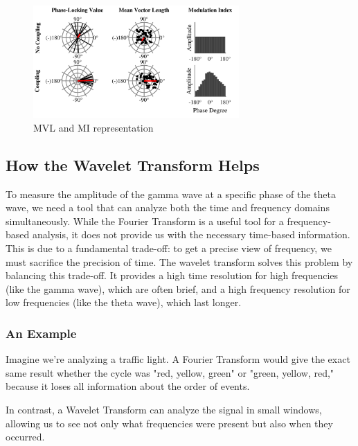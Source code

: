 \documentclass[hidelinks,12pt]{article}
\begin{document}
	\newpage
	
	
	\begin{figure}[h!]
		\centering
		\includegraphics[width=0.7\textwidth]{1}
		\caption[Caption for LOF]{MVL and MI representation\footnotemark}
	\end{figure}
	
	
	\subsection{How the Wavelet Transform Helps}
	To measure the amplitude of the gamma wave at a specific phase of the theta wave, we need a tool that can analyze both the time and frequency domains simultaneously. While the Fourier Transform is a useful tool for a frequency-based analysis, it does not provide us with the necessary time-based information. This is due to a fundamental trade-off: to get a precise view of frequency, we must sacrifice the precision of time. The wavelet transform solves this problem by balancing this trade-off. It provides a high time resolution for high frequencies (like the gamma wave), which are often brief, and a high frequency resolution for low frequencies (like the theta wave), which last longer.
	
	\subsubsection*{An Example} Imagine we're analyzing a traffic light. A Fourier Transform would give the exact same result whether the cycle was "red, yellow, green" or "green, yellow, red," because it loses all information about the order of events.
	
	In contrast, a Wavelet Transform can analyze the signal in small windows, allowing us to see not only what frequencies were present but also when they occurred.
\end{document}

